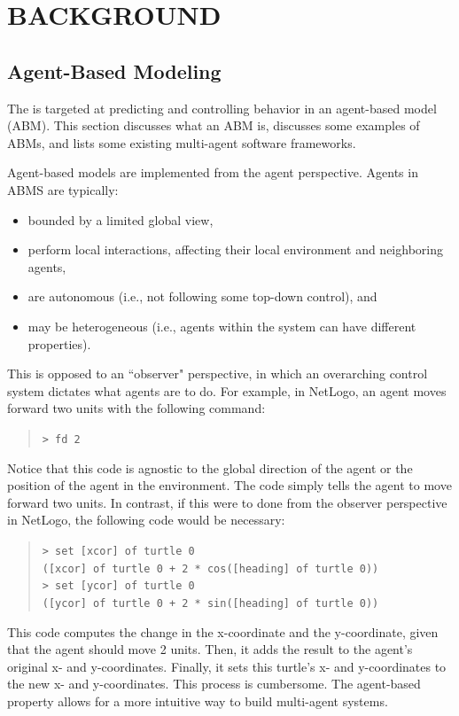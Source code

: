 \chapter{BACKGROUND}
\thispagestyle{plain}

\label{Background}

\section{Agent-Based Modeling}
The \framework is targeted at predicting and controlling behavior in an agent-based model (ABM).
This section discusses what an ABM is, discusses some examples of ABMs, and lists some existing multi-agent software frameworks.

Agent-based models are implemented from the agent perspective.
Agents in ABMS are typically:
\begin{itemize}
   \item bounded by a limited global view,
   \item perform local interactions, affecting their local environment and neighboring agents,
   \item are autonomous (i.e., not following some top-down control), and
   \item may be heterogeneous (i.e., agents within the system can have different properties).
\end{itemize}\cite{epstein1999agent}
This is opposed to an ``observer" perspective, in which an overarching control system dictates what agents are to do.
For example, in NetLogo, an agent moves forward two units with the following command:
\begin{quote}
\texttt{\small > fd 2}
\end{quote}
Notice that this code is agnostic to the global direction of the agent or the position of the agent in the environment.
The code simply tells the agent to move forward two units.
In contrast, if this were to done from the observer perspective in NetLogo, the following code would be necessary:
\begin{quote}
\texttt{\small > set [xcor] of turtle 0\\
([xcor] of turtle 0 + 2 * cos([heading] of turtle 0))\\
> set [ycor] of turtle 0\\
([ycor] of turtle 0 + 2 * sin([heading] of turtle 0))}
\end{quote}
This code computes the change in the x-coordinate and the y-coordinate, given that the agent should move 2 units.
Then, it adds the result to the agent's original x- and y-coordinates.
Finally, it sets this turtle's x- and y-coordinates to the new x- and y-coordinates.
This process is cumbersome.
The agent-based property allows for a more intuitive way to build multi-agent systems.

